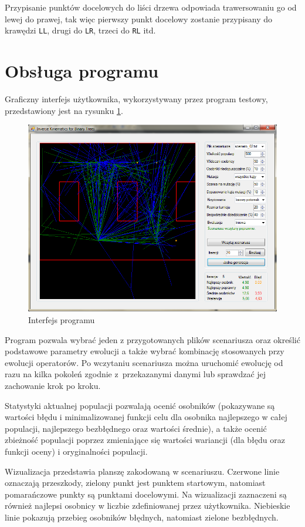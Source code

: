 \documentclass[11pt, leqno]{article}
\begin{document}
Przypisanie punktów docelowych do liści drzewa odpowiada trawersowaniu go od lewej do prawej, tak więc pierwszy punkt docelowy zostanie przypisany do krawędzi \texttt{LL}, drugi do \texttt{LR}, trzeci do \texttt{RL} itd.

\section{Obsługa programu}
Graficzny interfejs użytkownika, wykorzystywany przez program testowy, przedstawiony jest na rysunku \ref{fig:gui}.
\begin{figure}[h!]
	\centering
	\includegraphics[scale=0.5]{gui}
	\caption{Interfejs programu}
	\label{fig:gui}
\end{figure}

Program pozwala wybrać jeden z przygotowanych plików scenariusza oraz określić podstawowe parametry ewolucji a także wybrać kombinację stosowanych przy ewolucji operatorów. Po wczytaniu scenariusza można uruchomić ewolucję od razu na kilka pokoleń zgodnie z~przekazanymi danymi lub sprawdzać jej zachowanie krok po kroku.

Statystyki aktualnej populacji pozwalają ocenić osobników (pokazywane są wartości błędu i minimalizowanej funkcji celu dla osobnika najlepszego w całej populacji, najlepszego bezbłędnego oraz wartości średnie), a także ocenić zbieżność populacji poprzez zmieniające się wartości wariancji (dla błędu oraz funkcji oceny) i oryginalności populacji. 

Wizualizacja przedstawia planszę zakodowaną w scenariuszu. Czerwone linie oznaczają przeszkody, zielony punkt jest punktem startowym, natomiast pomarańczowe punkty są punktami docelowymi. Na wizualizacji zaznaczeni są również najlepsi osobnicy w liczbie zdefiniowanej przez użytkownika. Niebieskie linie pokazują przebieg osobników błędnych, natomiast zielone bezbłędnych.
\end{document}
